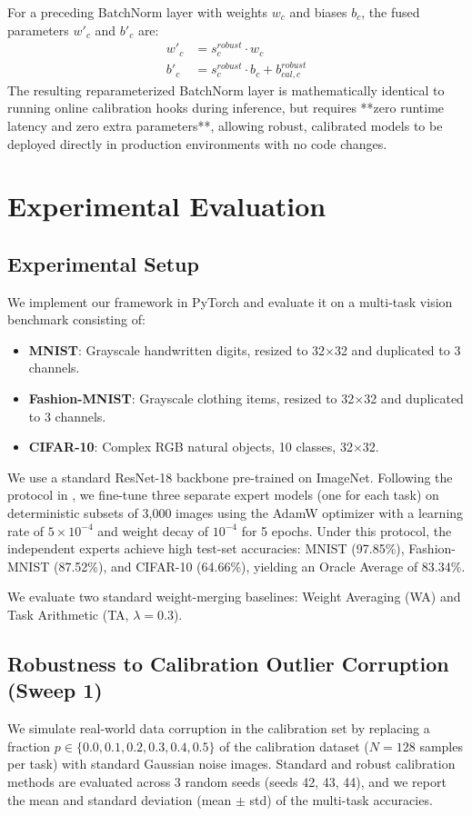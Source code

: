 \documentclass{article}
\theoremstyle{plain}
\theoremstyle{definition}
\theoremstyle{remark}
\begin{document}
For a preceding BatchNorm layer with weights $w_c$ and biases $b_c$, the fused parameters $w'_c$ and $b'_c$ are:
\begin{align}
  w'_c &= s^{robust}_c \cdot w_c \\
  b'_c &= s^{robust}_c \cdot b_c + b^{robust}_{cal, c}
\end{align}
The resulting reparameterized BatchNorm layer is mathematically identical to running online calibration hooks during inference, but requires **zero runtime latency and zero extra parameters**, allowing robust, calibrated models to be deployed directly in production environments with no code changes.

\section{Experimental Evaluation}
\label{sec:experiments}

\subsection{Experimental Setup}
We implement our framework in PyTorch and evaluate it on a multi-task vision benchmark consisting of:
\begin{itemize}
  \item \textbf{MNIST}: Grayscale handwritten digits, resized to 32$\times$32 and duplicated to 3 channels.
  \item \textbf{Fashion-MNIST}: Grayscale clothing items, resized to 32$\times$32 and duplicated to 3 channels.
  \item \textbf{CIFAR-10}: Complex RGB natural objects, 10 classes, 32$\times$32.
\end{itemize}

We use a standard ResNet-18 backbone pre-trained on ImageNet. Following the protocol in \cite{ziocf2026}, we fine-tune three separate expert models (one for each task) on deterministic subsets of 3,000 images using the AdamW optimizer with a learning rate of $5 \times 10^{-4}$ and weight decay of $10^{-4}$ for 5 epochs. Under this protocol, the independent experts achieve high test-set accuracies: MNIST (97.85\%), Fashion-MNIST (87.52\%), and CIFAR-10 (64.66\%), yielding an Oracle Average of 83.34\%.

We evaluate two standard weight-merging baselines: Weight Averaging (WA) and Task Arithmetic (TA, $\lambda = 0.3$).

\subsection{Robustness to Calibration Outlier Corruption (Sweep 1)}
We simulate real-world data corruption in the calibration set by replacing a fraction $p \in \{0.0, 0.1, 0.2, 0.3, 0.4, 0.5\}$ of the calibration dataset ($N=128$ samples per task) with standard Gaussian noise images. Standard and robust calibration methods are evaluated across 3 random seeds (seeds 42, 43, 44), and we report the mean and standard deviation (mean $\pm$ std) of the multi-task accuracies.
\end{document}
